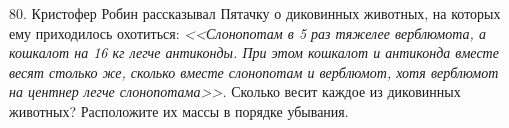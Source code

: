 80. Кристофер Робин рассказывал Пятачку о диковинных животных, на которых ему приходилось охотиться: {\it <<Слонопотам в 5 раз тяжелее верблюмота, а кошкалот на 16 кг легче антиконды. При этом кошкалот и антиконда вместе весят столько же, сколько вместе слонопотам и верблюмот, хотя верблюмот на центнер легче слонопотама>>.} Сколько весит каждое из диковинных животных? Расположите их массы в порядке убывания.\\
